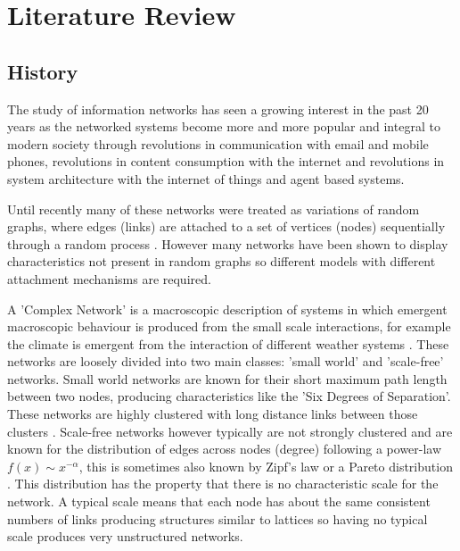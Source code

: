 
\chapter{Literature Review} %

\label{Chapter2} %

\section{History}

The study of information networks has seen a growing interest in the past 20 years as the networked systems become more and more popular and integral to modern society through revolutions in communication with email and mobile phones, revolutions in content consumption with the internet and revolutions in system architecture with the internet of things and agent based systems. 

Until recently many of these networks were treated as variations of random graphs, where edges (links) are attached to a set of vertices (nodes) sequentially through a random process \cite{erdds1959random,erd6s1960evolution}. However many networks have been shown to display characteristics not present in random graphs so different models with different attachment mechanisms are required. 

A 'Complex Network' is a macroscopic description of systems in which emergent macroscopic behaviour is produced from the small scale interactions, for example the climate is emergent from the interaction of different weather systems \cite{steinhaeuser2011complex}. These networks are loosely divided into two main classes: 'small world' and 'scale-free' networks. Small world networks are known for their short maximum path length between two nodes, producing characteristics like the 'Six Degrees of Separation'. These networks are highly clustered with long distance links between those clusters \cite{watts1998collective}. Scale-free networks however typically are not strongly clustered and are known for the distribution of edges across nodes (degree) following a power-law $f(x) \sim x^{-\alpha}$, this is sometimes also known by Zipf's law or a Pareto distribution \cite{zipf1935psycho}. This distribution has the property that there is no characteristic scale for the network. A typical scale means that each node has about the same consistent numbers of links producing structures similar to lattices so having no typical scale produces very unstructured networks. 

